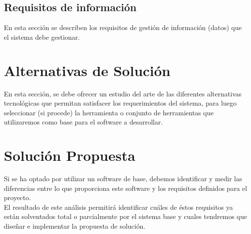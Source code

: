 \subsection{Requisitos de información}
En esta sección se describen los requisitos de gestión de información (datos) que el sistema debe gestionar.

\section{Alternativas de Solución}
En esta sección, se debe ofrecer un estudio del arte de las diferentes alternativas tecnológicas que permitan satisfacer los requerimientos del sistema, para luego seleccionar (si procede) la herramienta o conjunto de herramientas que utilizaremos como base para el software a desarrollar.

\section{Solución Propuesta}
Si se ha optado por utilizar un software de base, debemos identificar y medir las diferencias entre lo que proporciona este software y los requisitos definidos para el proyecto.\\
El resultado de este análisis permitirá identificar cuáles de éstos requisitos ya están solventados total o parcialmente por el sistema base y cuales tendremos que diseñar e implementar la propuesta de solución.